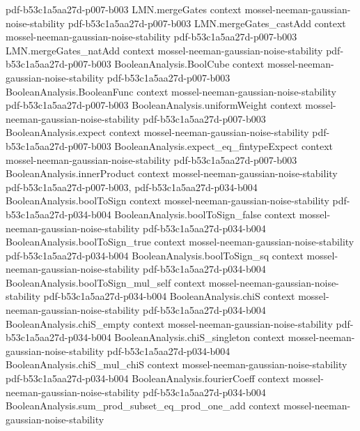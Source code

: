 \begin{theorem}
  {pdf-b53c1a5aa27d-p007-b003}
\proofstep
  {LMN.mergeGates}
  {context}
  {mossel-neeman-gaussian-noise-stability}
  {pdf-b53c1a5aa27d-p007-b003}
\proofstep
  {LMN.mergeGates_castAdd}
  {context}
  {mossel-neeman-gaussian-noise-stability}
  {pdf-b53c1a5aa27d-p007-b003}
\proofstep
  {LMN.mergeGates_natAdd}
  {context}
  {mossel-neeman-gaussian-noise-stability}
  {pdf-b53c1a5aa27d-p007-b003}
\proofstep
  {BooleanAnalysis.BoolCube}
  {context}
  {mossel-neeman-gaussian-noise-stability}
  {pdf-b53c1a5aa27d-p007-b003}
\proofstep
  {BooleanAnalysis.BooleanFunc}
  {context}
  {mossel-neeman-gaussian-noise-stability}
  {pdf-b53c1a5aa27d-p007-b003}
\proofstep
  {BooleanAnalysis.uniformWeight}
  {context}
  {mossel-neeman-gaussian-noise-stability}
  {pdf-b53c1a5aa27d-p007-b003}
\proofstep
  {BooleanAnalysis.expect}
  {context}
  {mossel-neeman-gaussian-noise-stability}
  {pdf-b53c1a5aa27d-p007-b003}
\proofstep
  {BooleanAnalysis.expect_eq_fintypeExpect}
  {context}
  {mossel-neeman-gaussian-noise-stability}
  {pdf-b53c1a5aa27d-p007-b003}
\proofstep
  {BooleanAnalysis.innerProduct}
  {context}
  {mossel-neeman-gaussian-noise-stability}
  {pdf-b53c1a5aa27d-p007-b003,
    pdf-b53c1a5aa27d-p034-b004}
\proofstep
  {BooleanAnalysis.boolToSign}
  {context}
  {mossel-neeman-gaussian-noise-stability}
  {pdf-b53c1a5aa27d-p034-b004}
\proofstep
  {BooleanAnalysis.boolToSign_false}
  {context}
  {mossel-neeman-gaussian-noise-stability}
  {pdf-b53c1a5aa27d-p034-b004}
\proofstep
  {BooleanAnalysis.boolToSign_true}
  {context}
  {mossel-neeman-gaussian-noise-stability}
  {pdf-b53c1a5aa27d-p034-b004}
\proofstep
  {BooleanAnalysis.boolToSign_sq}
  {context}
  {mossel-neeman-gaussian-noise-stability}
  {pdf-b53c1a5aa27d-p034-b004}
\proofstep
  {BooleanAnalysis.boolToSign_mul_self}
  {context}
  {mossel-neeman-gaussian-noise-stability}
  {pdf-b53c1a5aa27d-p034-b004}
\proofstep
  {BooleanAnalysis.chiS}
  {context}
  {mossel-neeman-gaussian-noise-stability}
  {pdf-b53c1a5aa27d-p034-b004}
\proofstep
  {BooleanAnalysis.chiS_empty}
  {context}
  {mossel-neeman-gaussian-noise-stability}
  {pdf-b53c1a5aa27d-p034-b004}
\proofstep
  {BooleanAnalysis.chiS_singleton}
  {context}
  {mossel-neeman-gaussian-noise-stability}
  {pdf-b53c1a5aa27d-p034-b004}
\proofstep
  {BooleanAnalysis.chiS_mul_chiS}
  {context}
  {mossel-neeman-gaussian-noise-stability}
  {pdf-b53c1a5aa27d-p034-b004}
\proofstep
  {BooleanAnalysis.fourierCoeff}
  {context}
  {mossel-neeman-gaussian-noise-stability}
  {pdf-b53c1a5aa27d-p034-b004}
\proofstep
  {BooleanAnalysis.sum_prod_subset_eq_prod_one_add}
  {context}
  {mossel-neeman-gaussian-noise-stability}

\end{theorem}

